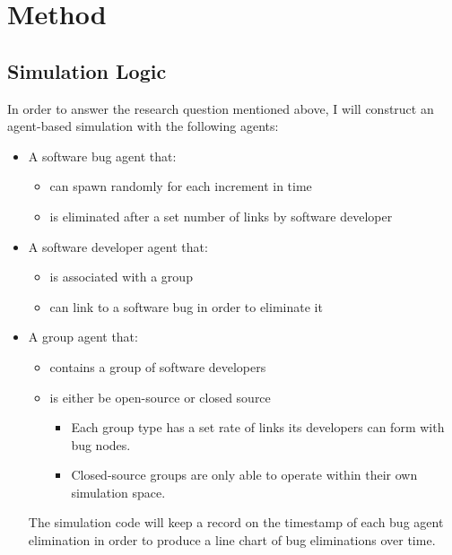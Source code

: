 \documentclass[10pt, a4paper, fleqn]{article}
\begin{document}
\section{Method}
\subsection{Simulation Logic}
In order to answer the research question mentioned above, I will construct an agent-based simulation with the following agents:
\begin{itemize}
	\item A software bug agent that:
	\begin{itemize}
		\item can spawn randomly for each increment in time
		\item is eliminated after a set number of links by software developer
	\end{itemize}
	\item A software developer agent that:
	\begin{itemize}
		\item is associated with a group
		\item can link to a software bug in order to eliminate it
	\end{itemize}
	\item A group agent that:
	\begin{itemize}
		\item contains a group of software developers
		\item is either be open-source or closed source
		\begin{itemize}
			\item Each group type has a set rate of links its developers can form with bug nodes.
			\item Closed-source groups are only able to operate within their own simulation space.
		\end{itemize}
	\end{itemize}
	The simulation code will keep a record on the timestamp of each bug agent elimination in order to produce a line chart of bug eliminations over time.
\end{itemize}
\end{document}
